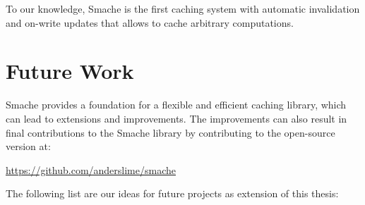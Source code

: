 To our knowledge, Smache is the first caching system with automatic invalidation and on-write updates that allows to cache arbitrary computations.

\section{Future Work}
\label{sec:future_work}

Smache provides a foundation for a flexible and efficient caching library, which can lead to extensions and improvements. The improvements can also result in final contributions to the Smache library by contributing to the open-source version at:

\url{https://github.com/anderslime/smache}

The following list are our ideas for future projects as extension of this thesis:

